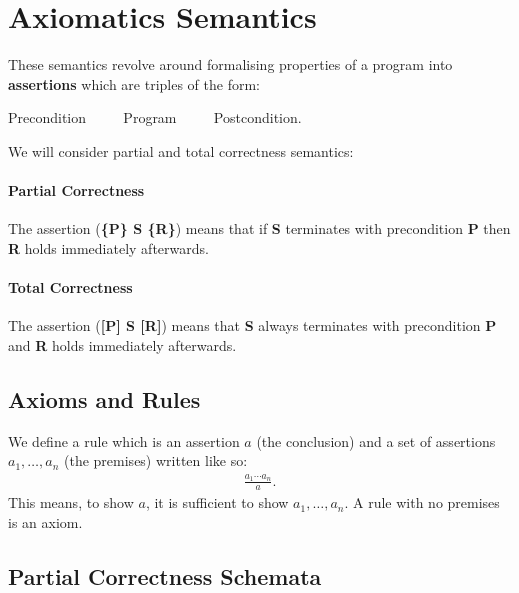 \section{Axiomatics Semantics}

These semantics revolve around formalising properties of a program
into \textbf{assertions} which are triples of the form: \begin{center}
  Precondition $\qquad$ Program $\qquad$ Postcondition.
\end{center} We will consider partial and total correctness semantics:

\paragraph{Partial Correctness} The assertion (\textbf{\{P\} S \{R\}})
means that if \textbf{S} terminates with precondition \textbf{P}
then \textbf{R} holds immediately afterwards.

\paragraph{Total Correctness} The assertion (\textbf{[P] S [R]})
means that \textbf{S} always terminates with precondition \textbf{P}
and \textbf{R} holds immediately afterwards.

\subsection{Axioms and Rules}

We define a rule which is an assertion $a$ (the conclusion)
and a set of assertions $a_1, \ldots, a_n$ (the premises)
written like so: \begin{gather*}
  \frac{a_1 \cdots a_n}{a}.
\end{gather*} This means, to show $a$, it is sufficient to show
$a_1, \ldots, a_n$. A rule with no premises is an axiom.

\vfill

\subsection{Partial Correctness Schemata}

